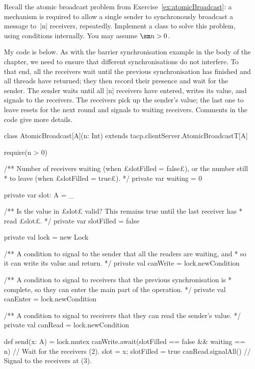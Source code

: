 \begin{question}
Recall the atomic broadcast problem from Exercise~\ref{ex:atomicBroadcast}: a
mechanism is required to allow a single sender to synchronously broadcast a
message to~|n| receivers, repeatedly.  Implement a class to solve this
problem, using conditions internally.  You may assume $\sm n > 0$.
\end{question}


\begin{answerI}
My code is below.  As with the barrier synchronisation example in the body of
the chapter, we need to ensure that different synchronisations do not
interfere.  To that end, all the receivers wait until the previous
synchronisation has finished and all threads have returned; they then record
their presence and wait for the sender.  The sender waits until all |n|
receivers have entered, writes its value, and signals to the receivers.  The
receivers pick up the sender's value; the last one to leave resets for the
next round and signals to waiting receivers.  Comments in the code give more
details. 
%
\begin{scala}
class AtomicBroadcast[A](n: Int) extends tacp.clientServer.AtomicBroadcastT[A]{
  require(n > 0)

  /** Number of receivers waiting (when £slotFilled = false£), or the number still
    * to leave (when £slotFilled = true£). */
  private var waiting = 0

  private var slot: A = _

  /** Is the value in £slot£ valid?  This remains true until the last receiver has
    * read £slot£. */
  private var slotFilled = false

  private val lock = new Lock

  /** A condition to signal to the sender that all the readers are waiting, and
    * so it can write its value and return. */
  private val canWrite = lock.newCondition

  /** A condition to signal to receivers that the previous synchronisation is
    * complete, so they can enter the main part of the operation. */
  private val canEnter = lock.newCondition

  /** A condition to signal to receivers that they can read the sender's value. */
  private val canRead = lock.newCondition

  def send(x: A) = lock.mutex{
    canWrite.await(slotFilled == false && waiting == n) 
                                             // Wait for the receivers (2).
    slot = x; slotFilled = true
    canRead.signalAll() // Signal to the receivers at (3).
  }

}
\end{scala}
\end{answerI}
